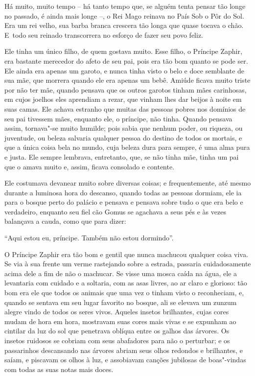  

Há muito, muito tempo -- há tanto tempo que, se alguém tenta pensar tão
longe no passado, é ainda mais longe --, o Rei Mago reinava no País Sob
o Pôr do Sol. Era um rei velho, sua barba branca crescera tão longa que
quase tocava o chão. E~todo seu reinado transcorrera no esforço de fazer
seu povo feliz.

Ele tinha um único filho, de quem gostava muito. Esse filho, o Príncipe
Zaphir, era bastante merecedor do afeto de seu pai, pois era tão bom
quanto se pode ser. Ele ainda era apenas um garoto, e nunca tinha visto
o belo e doce semblante de sua mãe, que morrera quando ele era apenas um
bebê. Amiúde ficava muito triste por não ter mãe, quando pensava que os
outros garotos tinham mães carinhosas, em cujos joelhos eles aprendiam a
rezar, que vinham lhes dar beijos à noite em suas camas. Ele achava
estranho que muitas das pessoas pobres nos domínios de seu pai tivessem
mães, enquanto ele, o príncipe, não tinha. Quando pensava assim,
tornava"-se muito humilde; pois sabia que nenhum poder, ou riqueza, ou
juventude, ou beleza salvaria qualquer pessoa do destino de todos os
mortais, e que a única coisa bela no mundo, cuja beleza dura para
sempre, é uma alma pura e justa. Ele sempre lembrava, entretanto, que,
se não tinha mãe, tinha um pai que o amava muito e, assim, ficava
consolado e contente.



Ele costumava devanear muito sobre diversas coisas; e frequentemente,
até mesmo durante a luminosa hora do descanso, quando todas as pessoas
dormiam, ele ia para o bosque perto do palácio e pensava e pensava sobre
tudo o que era belo e verdadeiro, enquanto seu fiel cão Gomus se
agachava a seus pés e às vezes balançava a cauda, como que para dizer:

``Aqui estou eu, príncipe. Também não estou dormindo''.

O Príncipe Zaphir era tão bom e gentil que nunca machucou qualquer coisa
viva. Se via à sua frente um verme rastejando sobre a estrada, passaria
cuidadosamente acima dele a fim de não o machucar. Se visse uma mosca
caída na água, ele a levantaria com cuidado e a soltaria, com as asas
livres, ao ar claro e glorioso: tão bom era ele que todos os animais que
uma vez o tinham visto o reconheciam, e, quando se sentava em seu lugar
favorito no bosque, ali se elevava um zunzum alegre vindo de todos os
seres vivos. Aqueles insetos brilhantes, cujas cores mudam de hora em
hora, mostravam suas cores mais vivas e se expunham ao cintilar da luz
do sol que penetrava oblíqua entre os galhos das árvores. Os insetos
ruidosos se cobriam com seus abafadores para não o perturbar; e os
passarinhos descansando nas árvores abriam seus olhos redondos e
brilhantes, e saíam, e piscavam os olhos à luz, e assobiavam canções
jubilosas de boas"-vindas com todas as suas notas mais doces.

